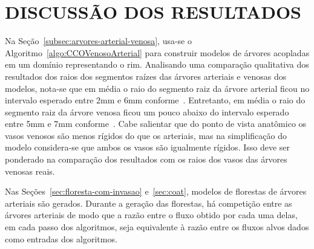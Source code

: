 \begin{figure}[!htb]

  \label{fig:diametro-medio-floresta-coat-caso-3arvores-3d-parte5}
\end{figure}

\section{DISCUSSÃO DOS RESULTADOS} \label{sec:discussao-dos-resultados}

Na Seção~\ref{subsec:arvores-arterial-venosa}, usa-se o Algoritmo~\ref{algo:CCOVenosoArterial} para
construir modelos de árvores acopladas em um domínio representando o rim. 
Analisando uma comparação qualitativa dos resultados dos raios dos segmentos raízes 
das árvores arteriais e venosas dos modelos, nota-se que em média o raio do segmento 
raiz da árvore arterial ficou no intervalo esperado entre 2mm e 6mm conforme~\cite{Weld2005}. 
Entretanto, em média o raio do segmento raiz da árvore venosa ficou um pouco abaixo do 
intervalo esperado entre 5mm e 7mm conforme~\cite{Satyapal2019}. 
Cabe salientar que do ponto de vista anatômico os vasos venosos são menos 
rígidos do que os arteriais, mas na simplificação do modelo considera-se que ambos 
os vasos são igualmente rígidos. Isso deve ser ponderado 
na comparação dos resultados com os raios dos vasos das árvores venosas reais.

Nas Seções~\ref{sec:floresta-com-invasao} e~\ref{sec:coat}, modelos de florestas de 
árvores arteriais são gerados. Durante a geração das florestas, há competição entre 
as árvores arteriais de modo que a razão entre o fluxo obtido por cada uma delas, 
em cada passo dos algoritmos, seja equivalente à razão entre os fluxos alvos 
dados como entradas dos algoritmos. 


